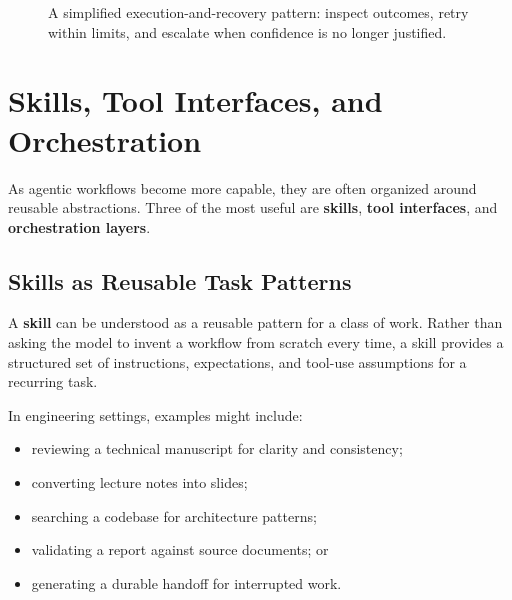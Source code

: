 \documentclass[12pt]{article}
\begin{document}
\begin{figure}[ht]
    \centering
    \caption{A simplified execution-and-recovery pattern: inspect outcomes, retry within limits, and escalate when confidence is no longer justified.}
\end{figure}

\section{Skills, Tool Interfaces, and Orchestration}

As agentic workflows become more capable, they are often organized around reusable abstractions. Three of the most useful are \textbf{skills}, \textbf{tool interfaces}, and \textbf{orchestration layers}.

\subsection{Skills as Reusable Task Patterns}

A \textbf{skill} can be understood as a reusable pattern for a class of work. Rather than asking the model to invent a workflow from scratch every time, a skill provides a structured set of instructions, expectations, and tool-use assumptions for a recurring task.

In engineering settings, examples might include:
\begin{itemize}
    \item reviewing a technical manuscript for clarity and consistency;
    \item converting lecture notes into slides;
    \item searching a codebase for architecture patterns;
    \item validating a report against source documents; or
    \item generating a durable handoff for interrupted work.
\end{itemize}
\end{document}
